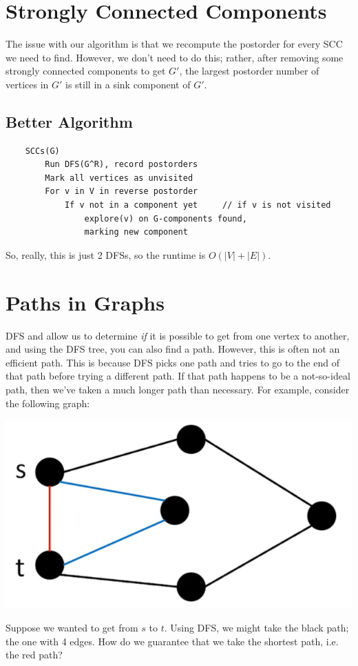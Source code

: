 \documentclass[letterpaper]{article}
\begin{document}
\section{Strongly Connected Components}
The issue with our algorithm is that we recompute the postorder for every SCC we need to find. However, we don't need to do this; rather, after removing some strongly connected components to get $G'$, the largest postorder number of vertices in $G'$ is still in a sink component of $G'$. 

\subsection{Better Algorithm}
\begin{verbatim}
    SCCs(G)
        Run DFS(G^R), record postorders
        Mark all vertices as unvisited 
        For v in V in reverse postorder 
            If v not in a component yet     // if v is not visited 
                explore(v) on G-components found,
                marking new component 
\end{verbatim}

So, really, this is just 2 DFSs, so the runtime is $O(|V| + |E|)$. 

\section{Paths in Graphs}
DFS and  allow us to determine \emph{if} it is possible to get from one vertex to another, and using the DFS tree, you can also find a path. However, this is often not an efficient path. This is because DFS picks one path and tries to go to the end of that path before trying a different path. If that path happens to be a not-so-ideal path, then we've taken a much longer path than necessary. For example, consider the following graph:
\begin{center}
    \includegraphics[scale=0.4]{../assets/dfs_bfs_comp.png}
\end{center}
Suppose we wanted to get from $s$ to $t$. Using DFS, we might take the black path; the one with 4 edges. How do we guarantee that we take the shortest path, i.e. the red path? 
\end{document}
